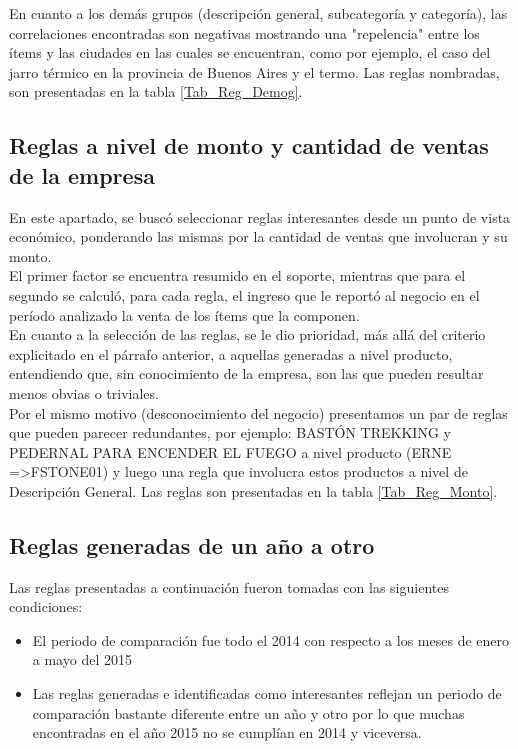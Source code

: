 \documentclass[]{article}
\begin{document}
	En cuanto a los demás grupos (descripción general, subcategoría y categoría), las correlaciones encontradas son negativas mostrando una "repelencia" entre los ítems y las ciudades en las cuales se encuentran, como por ejemplo, el caso del jarro térmico en la provincia de Buenos Aires y el termo. Las reglas nombradas, son presentadas en la tabla  \ref{Tab_Reg_Demog}.
	
	\subsection{Reglas a nivel de monto y cantidad de ventas de la empresa}
	
	En este apartado, se buscó seleccionar reglas interesantes desde un punto de vista económico, ponderando las mismas por la cantidad de ventas que involucran y su monto.\\
	
	El primer factor se encuentra resumido en el soporte, mientras que para el segundo se calculó, para cada regla, el ingreso que le reportó al negocio en el período analizado la venta de los ítems que la componen.\\
	
	En cuanto a la selección de las reglas, se le dio prioridad, más allá del criterio explicitado en el párrafo anterior, a aquellas generadas a nivel producto, entendiendo que, sin conocimiento de la empresa, son las que pueden resultar menos obvias o triviales.\\
	
	Por el mismo motivo (desconocimiento del negocio) presentamos un par de reglas que pueden parecer redundantes, por ejemplo: BASTÓN TREKKING y PEDERNAL PARA ENCENDER EL FUEGO a nivel producto ({ERNE} =\textgreater {FSTONE01}) y luego una regla que involucra estos productos a nivel de Descripción General. Las reglas son presentadas en la tabla \ref{Tab_Reg_Monto}.
	
	\subsection{Reglas generadas de un año a otro}
	Las reglas presentadas a continuación fueron tomadas con las siguientes condiciones:
	\begin{itemize}
		\item El periodo de comparación fue todo el 2014 con respecto a los meses de enero a mayo del 2015
		\item Las reglas generadas e identificadas como interesantes reflejan un periodo de comparación bastante diferente entre un año y otro por lo que muchas encontradas en el año 2015 no se cumplían en 2014 y viceversa.
	\end{itemize}
	
\end{document}
